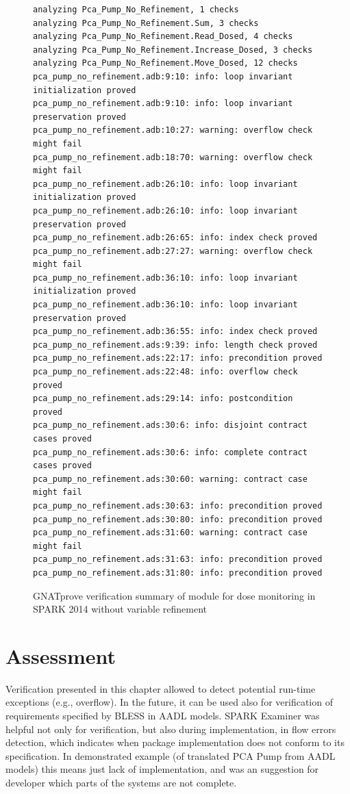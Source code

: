 \begin{figure}
\singlespacing
\begin{lstlisting}[frame=single, gobble=0]
analyzing Pca_Pump_No_Refinement, 1 checks
analyzing Pca_Pump_No_Refinement.Sum, 3 checks
analyzing Pca_Pump_No_Refinement.Read_Dosed, 4 checks
analyzing Pca_Pump_No_Refinement.Increase_Dosed, 3 checks
analyzing Pca_Pump_No_Refinement.Move_Dosed, 12 checks
pca_pump_no_refinement.adb:9:10: info: loop invariant initialization proved
pca_pump_no_refinement.adb:9:10: info: loop invariant preservation proved
pca_pump_no_refinement.adb:10:27: warning: overflow check might fail
pca_pump_no_refinement.adb:18:70: warning: overflow check might fail
pca_pump_no_refinement.adb:26:10: info: loop invariant initialization proved
pca_pump_no_refinement.adb:26:10: info: loop invariant preservation proved
pca_pump_no_refinement.adb:26:65: info: index check proved
pca_pump_no_refinement.adb:27:27: warning: overflow check might fail
pca_pump_no_refinement.adb:36:10: info: loop invariant initialization proved
pca_pump_no_refinement.adb:36:10: info: loop invariant preservation proved
pca_pump_no_refinement.adb:36:55: info: index check proved
pca_pump_no_refinement.ads:9:39: info: length check proved
pca_pump_no_refinement.ads:22:17: info: precondition proved
pca_pump_no_refinement.ads:22:48: info: overflow check proved
pca_pump_no_refinement.ads:29:14: info: postcondition proved
pca_pump_no_refinement.ads:30:6: info: disjoint contract cases proved
pca_pump_no_refinement.ads:30:6: info: complete contract cases proved
pca_pump_no_refinement.ads:30:60: warning: contract case might fail
pca_pump_no_refinement.ads:30:63: info: precondition proved
pca_pump_no_refinement.ads:30:80: info: precondition proved
pca_pump_no_refinement.ads:31:60: warning: contract case might fail
pca_pump_no_refinement.ads:31:63: info: precondition proved
pca_pump_no_refinement.ads:31:80: info: precondition proved
\end{lstlisting}
\doublespacing
\caption{GNATprove verification summary of module for dose monitoring in SPARK 2014 without variable refinement}
\label{listing:pca_pump_move_dosed_unit_spark2014_gnatprove_no_refinement}
\end{figure}


\section{Assessment}
\label{verification:assessment}

Verification presented in this chapter allowed to detect potential run-time exceptions (e.g., overflow). In the future, it can be used also for verification of requirements specified by BLESS in AADL models. SPARK Examiner was helpful not only for verification, but also during implementation, in flow errors detection, which indicates when package implementation does not conform to its specification. In demonstrated example (of translated PCA Pump from AADL models) this means just lack of implementation, and was an suggestion for developer which parts of the systems are not complete.

